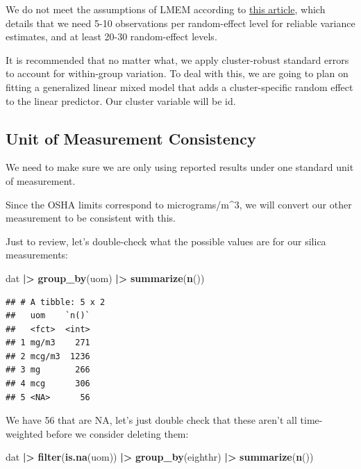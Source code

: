 \documentclass[
]{article}
\newenvironment{Shaded}{\begin{snugshade}}{\end{snugshade}}
\newcommand{\FunctionTok}[1]{\textcolor[rgb]{0.13,0.29,0.53}{\textbf{#1}}}
\newcommand{\NormalTok}[1]{#1}
\newcommand{\SpecialCharTok}[1]{\textcolor[rgb]{0.81,0.36,0.00}{\textbf{#1}}}
\begin{document}
We do not meet the assumptions of LMEM according to
\href{https://ladal.edu.au/tutorials/mixedmodel/mixedmodel.html}{this
article}, which details that we need 5-10 observations per random-effect
level for reliable variance estimates, and at least 20-30 random-effect
levels.

It is recommended that no matter what, we apply cluster-robust standard
errors to account for within-group variation. To deal with this, we are
going to plan on fitting a generalized linear mixed model that adds a
cluster-specific random effect to the linear predictor. Our cluster
variable will be id.

\subsection{Unit of Measurement
Consistency}\label{unit-of-measurement-consistency}

We need to make sure we are only using reported results under one
standard unit of measurement.

Since the OSHA limits correspond to micrograms/m\^{}3, we will convert
our other measurement to be consistent with this.

Just to review, let's double-check what the possible values are for our
silica measurements:

\begin{Shaded}
\begin{Highlighting}[]
\NormalTok{dat }\SpecialCharTok{|\textgreater{}} 
  \FunctionTok{group\_by}\NormalTok{(uom) }\SpecialCharTok{|\textgreater{}} 
  \FunctionTok{summarize}\NormalTok{(}\FunctionTok{n}\NormalTok{())}
\end{Highlighting}
\end{Shaded}

\begin{verbatim}
## # A tibble: 5 x 2
##   uom    `n()`
##   <fct>  <int>
## 1 mg/m3    271
## 2 mcg/m3  1236
## 3 mg       266
## 4 mcg      306
## 5 <NA>      56
\end{verbatim}

We have 56 that are NA, let's just double check that these aren't all
time-weighted before we consider deleting them:

\begin{Shaded}
\begin{Highlighting}[]
\NormalTok{dat }\SpecialCharTok{|\textgreater{}} 
  \FunctionTok{filter}\NormalTok{(}\FunctionTok{is.na}\NormalTok{(uom)) }\SpecialCharTok{|\textgreater{}} 
  \FunctionTok{group\_by}\NormalTok{(eighthr) }\SpecialCharTok{|\textgreater{}} 
  \FunctionTok{summarize}\NormalTok{(}\FunctionTok{n}\NormalTok{())}
\end{Highlighting}
\end{Shaded}
\end{document}
